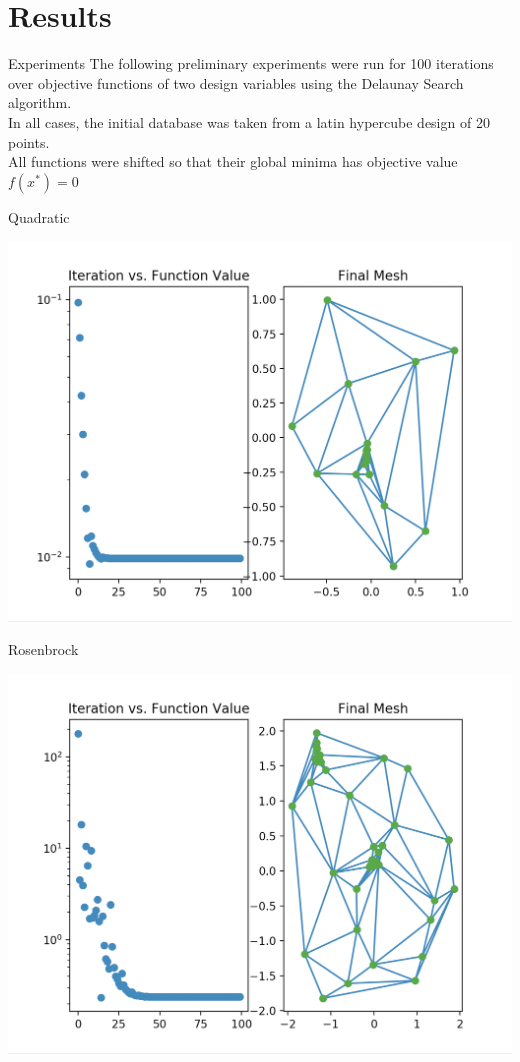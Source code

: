 \documentclass[xcolor=dvipsnames]{beamer}
\begin{document}
\section{Results}
\begin{frame}{Experiments}
The following preliminary experiments were run for 100 iterations over
objective functions of two design variables using the Delaunay Search
algorithm.\\
\medskip
In all cases, the initial database was taken from a latin hypercube design
of 20 points.\\
\medskip
All functions were shifted so that their global minima has objective
value $f(x^*) = 0$\\
\end{frame}
\begin{frame}{Quadratic}
\begin{center}
\includegraphics[width=0.8\columnwidth]{../img/delaunay_search/ds-QuadraticError.png}
\end{center}
\end{frame}
\begin{frame}{Rosenbrock}
\begin{center}
\includegraphics[width=0.8\columnwidth]{../img/delaunay_search/ds-RosenbrockError.png}
\end{center}
\end{frame}
\end{document}
